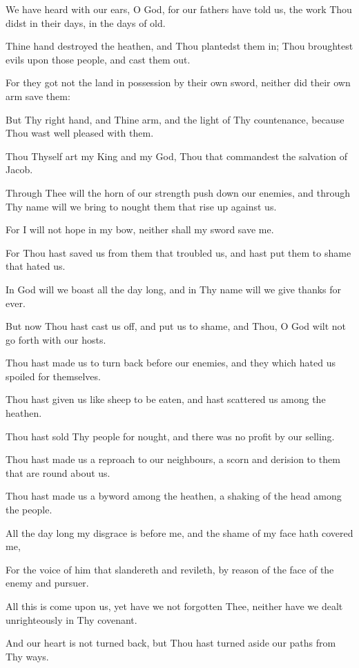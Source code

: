 We have heard with our ears, O God, for our fathers have told us, the work Thou didst in their days, in the days of old.

Thine hand destroyed the heathen, and Thou plantedst them in; Thou broughtest evils upon those people, and cast them out.

For they got not the land in possession by their own sword, neither did their own arm save them:

But Thy right hand, and Thine arm, and the light of Thy countenance, because Thou wast well pleased with them.

Thou Thyself art my King and my God, Thou that commandest the salvation of Jacob.

Through Thee will the horn of our strength push down our enemies, and through Thy name will we bring to nought them that rise up against us.

For I will not hope in my bow, neither shall my sword save me.

For Thou hast saved us from them that troubled us, and hast put them to shame that hated us.

In God will we boast all the day long, and in Thy name will we give thanks for ever.

But now Thou hast cast us off, and put us to shame, and Thou, O God wilt not go forth with our hosts.

Thou hast made us to turn back before our enemies, and they which hated us spoiled for themselves.

Thou hast given us like sheep to be eaten, and hast scattered us among the heathen.

Thou hast sold Thy people for nought, and there was no profit by our selling.

Thou hast made us a reproach to our neighbours, a scorn and derision to them that are round about us.

Thou hast made us a byword among the heathen, a shaking of the head among the people.

All the day long my disgrace is before me, and the shame of my face hath covered me,

For the voice of him that slandereth and revileth, by reason of the face of the enemy and pursuer.

All this is come upon us, yet have we not forgotten Thee, neither have we dealt unrighteously in Thy covenant.

And our heart is not turned back, but Thou hast turned aside our paths from Thy ways.

